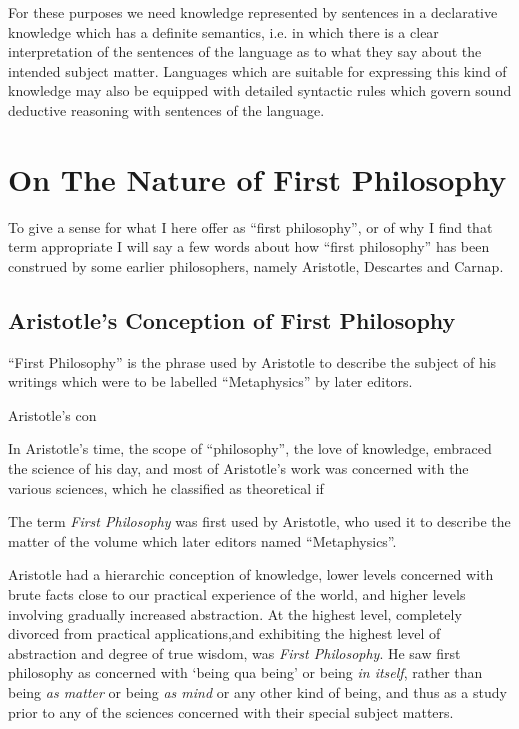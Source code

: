 \documentclass[10pt,titlepage]{book}
\begin{document}
For these purposes we need knowledge represented by sentences in a declarative knowledge which has a definite semantics, i.e. in which there is a clear interpretation of the sentences of the language as to what they say about the intended subject matter.
Languages which are suitable for expressing this kind of knowledge may also be equipped with detailed syntactic rules which govern sound deductive reasoning with sentences of the language.

\section{On The Nature of First Philosophy}

To give a sense for what I here offer as ``first philosophy'', or of why I find that term appropriate I will say a few words about how ``first philosophy'' has been construed by some earlier philosophers, namely Aristotle, Descartes and Carnap.

\subsection{Aristotle's Conception of First Philosophy}

``First Philosophy'' is the phrase used by Aristotle to describe the subject of his writings which were to be labelled ``Metaphysics'' by later editors.

Aristotle's con

In Aristotle's time, the scope of ``philosophy'', the love of knowledge, embraced the science of his day, and most of Aristotle's work was concerned with the various sciences, which he classified as theoretical if

The term \emph{First Philosophy} was first used by Aristotle, who used it to describe the matter of the volume which later editors named ``Metaphysics''\cite{aristotleMetap}.

Aristotle had a hierarchic conception of knowledge, lower levels concerned with brute facts close to our practical experience of the world, and higher levels involving gradually increased abstraction.
At the highest level, completely divorced from practical applications,and  exhibiting the highest level of abstraction and degree of true wisdom, was \emph{First Philosophy}.
He saw first philosophy as concerned with `being qua being' or being \emph{in  itself}, rather than being \emph{as matter} or being \emph{as mind} or any other kind of being, and thus as a study prior to any of the sciences concerned with their special subject matters.
\end{document}
